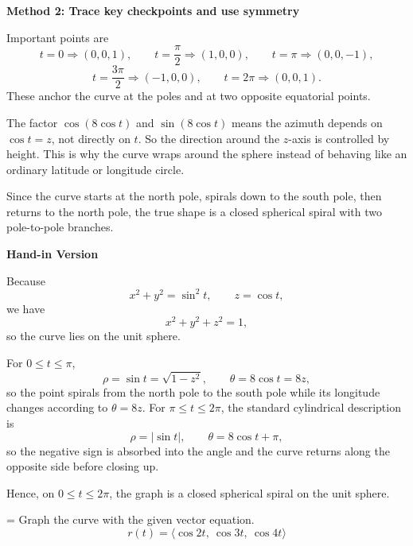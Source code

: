 \documentclass[a4paper,12pt,twocolumn]{article}
\newlength{\problemnumberwidth}
\newenvironment{solutionbox}{\begin{framed}}{\end{framed}}
\newcommand{\problem}[3]{%
  \Needspace{10\baselineskip}%
  \phantomsection\label{#1}%
  \par\vspace{0.8em}%
  \noindent
  \hangindent=\problemnumberwidth
  \hangafter=1
  \makebox[\problemnumberwidth][l]{\textbf{#2.}}#3\par
}
\begin{document}
\begin{solutionbox}
\textbf{Method 2: Trace key checkpoints and use symmetry}

\begin{steps}
\item Important points are
\[
t=0\Rightarrow (0,0,1),\qquad
t=\frac{\pi}{2}\Rightarrow (1,0,0),\qquad
t=\pi\Rightarrow (0,0,-1),
\]
\[
t=\frac{3\pi}{2}\Rightarrow (-1,0,0),\qquad
t=2\pi\Rightarrow (0,0,1).
\]
These anchor the curve at the poles and at two opposite equatorial points.

\item The factor \(\cos(8\cos t)\) and \(\sin(8\cos t)\) means the azimuth depends on \(\cos t=z\), not directly on \(t\). So the direction around the \(z\)-axis is controlled by height. This is why the curve wraps around the sphere instead of behaving like an ordinary latitude or longitude circle.

\item Since the curve starts at the north pole, spirals down to the south pole, then returns to the north pole, the true shape is a closed spherical spiral with two pole-to-pole branches.
\end{steps}
\end{solutionbox}

\begin{solutionbox}
\textbf{Hand-in Version}

Because
\[
x^2+y^2=\sin^2 t,\qquad z=\cos t,
\]
we have
\[
x^2+y^2+z^2=1,
\]
so the curve lies on the unit sphere.

For \(0\le t\le \pi\),
\[
\rho=\sin t=\sqrt{1-z^2},
\qquad
\theta=8\cos t=8z,
\]
so the point spirals from the north pole to the south pole while its longitude changes according to \(\theta=8z\). For \(\pi\le t\le 2\pi\), the standard cylindrical description is
\[
\rho=|\sin t|,\qquad \theta=8\cos t+\pi,
\]
so the negative sign is absorbed into the angle and the curve returns along the opposite side before closing up.

Hence, on \(0\le t\le 2\pi\), the graph is a closed spherical spiral on the unit sphere.
\end{solutionbox}

\problem{prob:13-1-45}{45}{Graph the curve with the given vector equation.
\[
r(t)=\langle \cos 2t,\ \cos 3t,\ \cos 4t\rangle
\]}
\end{document}
